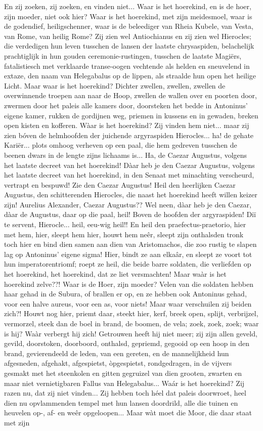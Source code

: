\documentclass[a4paper, 12pt, oneside, dutch]{article}
\begin{document}
En zij zoeken, zij zoeken, en vinden niet... Waar is het hoerekind, en is de hoer, zijn moeder, niet ook hier? Waar is het hoerekind, met zijn meidesmoel, waar is de godendief, heiligschenner, waar is de beleediger van Rheia Kubele, van Vesta, van Rome, van heilig Rome? Zij zien wel Antiochianus en zij zien wel Hierocles; die verdedigen hun leven tusschen de lansen der laatste chrysaspiden, belachelijk prachtiglijk in hun gouden ceremonie-rustingen, tusschen de laatste Magiërs, fatalistiesch met verklaarde transe-oogen vechtende als helden en sneuvelend in extaze, den naam van Helegabalus op de lippen, als straalde hun open het heilige Licht. Maar waar is het hoerekind? Dichter zwellen, zwellen, zwellen de overwinnende troepen aan naar de Hoop, zwellen de wallen over en poorten door, zwermen door het paleis alle kamers door, doorsteken het bedde in Antoninus' eigene kamer, rukken de gordijnen weg, priemen in kussens en in gewaden, breken open kisten en kofferen. Wàar is het hoerekind? Zij vinden hem niet... maar zij zien bóven de helmhoofden der juichende argyraspiden Hierocles... ha! de gehate Kariër... plots omhoog verheven op een paal, die hem gedreven tusschen de beenen dwars in de lengte zijns lichaams is... Ha, de Caezar Augustus, volgens het laatste decreet van het hoerekind! Dàar heb je den Caezar Augustus, volgens het laatste decreet van het hoerekind, in den Senaat met minachting verscheurd, vertrapt en bespuwd! Zie den Caezar Augustus! Heil den heerlijken Caezar Augustus, den schitterenden Hierocles, die naast het hoerekind heeft willen keizer zijn! Aurelius Alexander, Caezar Augustus?? Wel neen, dàar heb je den Caezar, dàar de Augustus, daar op die paal, heil! Boven de hoofden der argyraspiden! Diï te servent, Hierocle... heil, eeu-wig heil!! En heil den praefectus-praetorio, hier met hem, hier, sleept hem hier, houwt hem neêr, sleept zijn onthalsden tronk toch hier en bind dien samen aan dien van Aristomachos, die zoo rustig te slapen lag op Antoninus' eigene sigma! Hier, bindt ze aan elkaâr, en sleept ze voort tot hun imperatorentriomf; roept ze heil, die beide barre soldaten, die verliefden op het hoerekind, het hoerekind, dat ze liet versmachten! Maar waàr is het hoerekind zelve??! Waar is de Hoer, zijn moeder? Velen van die soldaten hebben haar gehad in de Subura, of brallen er op, en ze hebben ook Antoninus gehad, voor een halve aureus, voor een as, voor niets! Maar waar verschuilen zij beiden zich?! Houwt nog hier, priemt daar, steekt hier, kerf, breek open, splijt, verbrijzel, vermorzel, steek dan de boel in brand, de boomen, de vela; zoek, zoek, zoek; waar is hij? Waàr verbergt hij zich! Getrouwen heeft hij niet meer; zij zijn allen geveld, gevild, doorstoken, doorboord, onthalsd, gepriemd, gegooid op een hoop in den brand, gevierendeeld de leden, van een gereten, en de mannelijkheid hun afgesneden, afgehakt, afgespietst, òpgespietst, rondgedragen, in de vijvers gesmakt met het steenkolen en gitten gegruizel van dien grooten, zwarten en maar niet vernietigbaren Fallus van Helegabalus... Waár is het hoerekind? Zij razen nu, dat zij niet vinden... Zij hebben toch héel dat paleis doorwroet, heel dien nu opvlammenden tempel met hun lansen doordrild, alle die tuinen en heuvelen op-, af- en weêr opgeloopen... Maar wàt moet die Moor, die daar staat met zijn 
\end{document}
